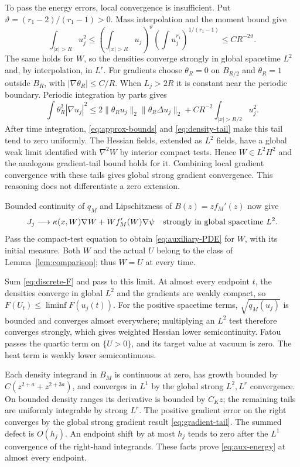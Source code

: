 \documentclass[11pt]{article}
\numberwithin{equation}{section}
\theoremstyle{definition}
\theoremstyle{remark}
\newcommand{\norm}[1]{\lVert #1\rVert}
\begin{document}
To pass the energy errors, local convergence is insufficient. Put
$\vartheta=(r_1-2)/(r_1-1)>0$. Mass interpolation and the moment bound give
\begin{equation}\label{eq:density-tail}
 \int_{|x|>R}u_j^2
 \le\left(\int_{|x|>R}u_j\right)^\vartheta
         \left(\int u_j^{r_1}\right)^{1/(r_1-1)}
 \le CR^{-2\vartheta}.
\end{equation}
The same holds for $W$, so the densities converge strongly in global
spacetime $L^2$ and, by interpolation, in $L^r$.
For gradients choose $\theta_R=0$ on $B_{R/2}$ and $\theta_R=1$ outside
$B_R$, with $|\nabla\theta_R|\le C/R$. When $L_j>2R$ it is constant
near the periodic boundary. Periodic integration by parts gives
\begin{equation}\label{eq:gradient-tail}
 \int\theta_R^2|\nabla u_j|^2
 \le2\norm{\theta_Ru_j}_2\norm{\theta_R\Delta u_j}_2
                +CR^{-2}\int_{|x|>R/2}u_j^2.
\end{equation}
After time integration, \eqref{eq:approx-bounds} and
\eqref{eq:density-tail} make this tail tend to zero uniformly.
The Hessian fields, extended as $L^2$ fields, have a global weak limit
identified with $\nabla^2W$ by interior compact tests. Hence $W\in L^2H^2$
and the analogous gradient-tail bound holds for it. Combining local
gradient convergence with these tails gives global strong gradient
convergence. This reasoning does not differentiate a zero extension.

Bounded continuity of $q_M$ and Lipschitzness of $B(z)=zf_M'(z)$ now give
\[
 J_j\longrightarrow\kappa(x,W)\nabla W+Wf_M'(W)\nabla\psi
       \quad\hbox{strongly in global spacetime }L^2.
\]
Pass the compact-test equation to obtain \eqref{eq:auxiliary-PDE} for $W$,
with its initial measure. Both $W$ and the actual $U$ belong to the class
of Lemma~\ref{lem:comparison}; thus $W=U$ at every time.

Sum \eqref{eq:discrete-F} and pass to this limit. At almost every endpoint
$t$, the densities converge in global $L^2$ and the gradients are weakly
compact, so $F(U_t)\le\liminf F(u_j(t))$. For the positive spacetime terms,
$\sqrt{q_M(u_j)}$ is bounded and converges almost everywhere; multiplying
an $L^2$ test therefore converges strongly, which gives weighted Hessian
lower semicontinuity. Fatou passes the quartic term on $\{U>0\}$, and
its target value at vacuum is zero. The heat term is weakly lower
semicontinuous.

Each density integrand in $B_M$ is continuous at zero, has growth bounded
by $C(z^{2+a}+z^{2+3a})$, and converges in $L^1$ by the global strong
$L^2,L^r$ convergence. On bounded density ranges its derivative is bounded
by $C_Kz$; the remaining tails are uniformly integrable by strong $L^r$.
The positive gradient error on the right converges by the global strong
gradient result \eqref{eq:gradient-tail}. The summed defect is $O(h_j)$.
An endpoint shift by at most $h_j$ tends to zero after the $L^1$ convergence
of the right-hand integrands. These facts prove \eqref{eq:aux-energy}
at almost every endpoint.
\end{document}
